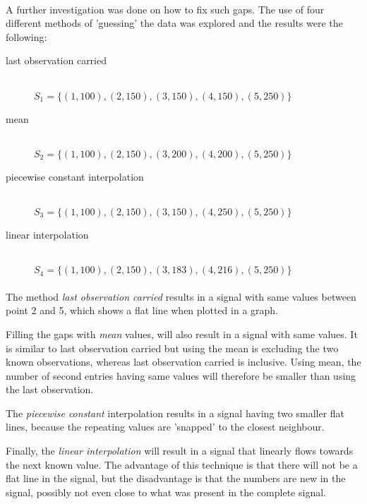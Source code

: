 \paragraph{}
A further investigation was done on how to fix such gaps. The use of four
different methods of 'guessing' the data was explored and the results were the
following:
\begin{description}
	\item[last observation carried] \hfill \\[1em]
	$S_{1} = \{(1,100), (2,150), (3,150), (4,150), (5,250)\}$

	\item[mean] \hfill \\[1em]
	$S_{2} = \{(1,100), (2,150), (3,200), (4,200), (5,250)\}$
	
	\item[piecewise constant interpolation] \hfill \\[1em]
	$S_{3} = \{(1,100), (2,150), (3,150), (4,250), (5,250)\}$
	
	\item[linear interpolation] \hfill \\[1em]
	$S_{4} = \{(1,100), (2,150), (3,183), (4,216), (5,250)\}$
\end{description}

\paragraph{}
The method \emph{last observation carried }\rm results in a signal with
same values between point 2 and 5, which shows a flat line when plotted in a
graph.

Filling the gaps with \emph{mean }\rm values, will also result in a signal with
same values. It is similar to last observation carried but using the mean is
excluding the two known observations, whereas last observation carried is
inclusive. Using mean, the number of second entries having same values
will therefore be smaller than using the last observation.

The \emph{piecewise constant }\rm interpolation results in a signal having two
smaller flat lines, because the repeating values are 'snapped' to the closest
neighbour.

Finally, the \emph{linear interpolation }\rm will result in a signal that
linearly flows towards the next known value. The advantage of this technique is
that there will not be a flat line in the signal, but the disadvantage is that
the numbers are new in the signal, possibly not even close to what was present
in the complete signal.

